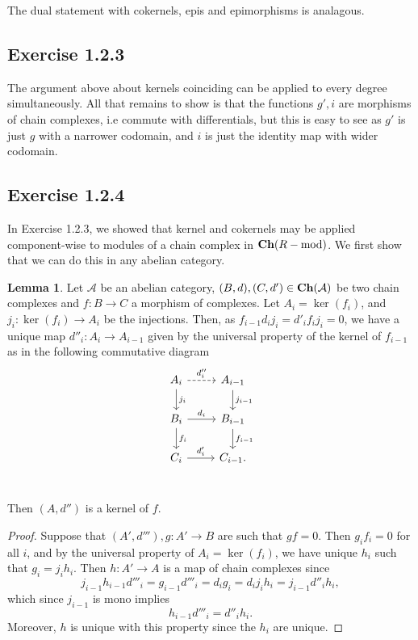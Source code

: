 \documentclass{article}
\theoremstyle{definition}
\newtheorem{lemma}[theorem]{Lemma}
\newcommand{\catname}[1]{{\normalfont\textbf{#1}}}
\newcommand{\Ch}{\catname{Ch}}
\begin{document}
The dual statement with cokernels, epis and epimorphisms is analagous.

\subsection*{Exercise 1.2.3}

The argument above about kernels coinciding can be applied to every degree
simultaneously. All that remains to show is that the functions $g', i$ are
morphisms of chain complexes, i.e commute with differentials, but this is easy
to see as $g'$ is just $g$ with a narrower codomain, and $i$ is just the
identity map with wider codomain.

\subsection*{Exercise 1.2.4}

In Exercise 1.2.3, we showed that kernel and cokernels may be applied 
component-wise to modules of a chain complex in $\Ch(R-\text{mod})$.
We first show that we can do this in any abelian category. 

\begin{lemma}
	Let $\mathcal{A}$ be an abelian category, $(B, d), (C, d') \in
	\Ch(\mathcal{A})$ be two chain complexes and $f : B \to C$ a morphism of
	complexes. Let $A_i = \ker(f_i)$, and $j_i : \ker(f_i) \to A_i$ be the
	injections. Then, as $f_{i-1} d_i j_i = d'_i f_i j_i = 0$, we have a unique
	map $d''_i : A_i \to A_{i - 1}$ given by the universal property
	of the kernel of $f_{i - 1}$ as in the following commutative diagram 
	\[
	\begin{tikzcd}
		A_i \arrow[r, dashed, "d''_i"] \arrow[d, "j_i"] & A_{i-1} \arrow[d, "j_{i-1}"]\\
		B_i \arrow[d, "f_i"] \arrow[r, "d_i"] & B_{i-1} \arrow[d, "f_{i-1}"] \\
		C_i \arrow[r, "d'_i"] & C_{i-1}. \\
	\end{tikzcd}
	\] 

	Then $(A, d'')$ is a kernel of $f$.
\end{lemma}
\begin{proof}
	Suppose that $(A', d'''), g : A' \to B$ are such that $gf = 0$. Then $g_i
	f_i = 0$ for all $i$, and by the universal property of $A_i = \ker(f_i)$,
	we have unique $h_i$ such that $g_i = j_i h_i$. Then $h : A' \to A$ is a
	map of chain complexes since 
	\[
		j_{i-1} h_{i-1} d'''_i
		=
		g_{i-1} d'''_i
		=
		d_i g_i
		=
		d_i j_i h_i
		=
		j_{i-1} d''_i h_i,
	\] 
	which since $j_{i-1}$ is mono implies
	\[
		h_{i-1} d'''_i
		=
		d''_i h_i.
	\]
	Moreover, $h$ is unique with this property since the $h_i$ are unique.
\end{proof}
\end{document}
